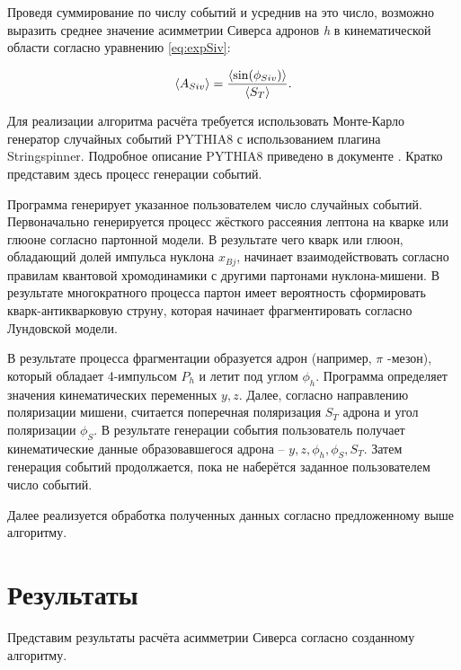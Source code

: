 \documentclass{extreport}
\begin{document}
Проведя суммирование по числу событий и усреднив на это число, возможно выразить среднее значение асимметрии Сиверса адронов \textit{h} в кинематической области согласно уравнению \ref{eq:expSiv}:

\begin{equation}
	\braket{A_{Siv}} = \frac{\braket{\sin (\phi_{Siv})}}{\braket{S_T}}.
\end{equation}

Для реализации алгоритма расчёта требуется использовать Монте-Карло генератор случайных событий PYTHIA8 с использованием плагина Stringspinner. Подробное описание PYTHIA8 приведено в документе \cite{Bierlich_2022}. Кратко представим здесь процесс генерации событий.

Программа генерирует указанное пользователем число случайных событий. Первоначально генерируется процесс жёсткого рассеяния лептона на кварке или глюоне согласно партонной модели. В результате чего кварк или глюон, обладающий долей импульса нуклона $x_{Bj}$, начинает взаимодействовать согласно правилам квантовой хромодинамики с другими партонами нуклона-мишени. В результате многократного процесса партон имеет вероятность сформировать кварк-антикварковую струну, которая начинает фрагментировать согласно Лундовской модели. 

В результате процесса фрагментации образуется адрон (например, $\pi$ -мезон), который обладает 4-импульсом $P_{h}$ и летит под углом $\phi_h$. Программа определяет значения кинематических переменных $y, z$. Далее, согласно направлению поляризации мишени, считается поперечная поляризация $S_T$ адрона и угол поляризации $\phi_S$. В результате генерации события пользователь получает кинематические данные образовавшегося адрона -- $y, z, \phi_h, \phi_S, S_T$. Затем генерация событий продолжается, пока не наберётся заданное пользователем число событий.

Далее реализуется обработка полученных данных согласно предложенному выше алгоритму. 

\section{Результаты}

Представим результаты расчёта асимметрии Сиверса согласно созданному алгоритму.
\end{document}
